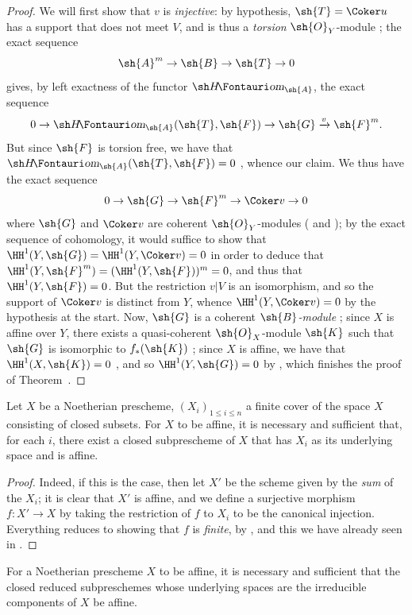 \begin{proof}
We will first show that $v$ is \emph{injective}:
by hypothesis, $\sh{T}=\Coker u$ has a support that does not meet $V$, and is thus a \emph{torsion} $\sh{O}_Y$-module ;
the exact sequence
\[
  \sh{A}^m\to\sh{B}\to\sh{T}\to0
\]
gives, by left exactness of the functor $\shHom_{\sh{A}}$, the exact sequence
\[
  0\to\shHom_{\sh{A}}(\sh{T},\sh{F})\to\sh{G}\xrightarrow{v}\sh{F}^m.
\]
But since $\sh{F}$ is torsion free, we have that $\shHom_{\sh{A}}(\sh{T},\sh{F})=0$ , whence our claim.
We thus have the exact sequence
\[
  0\to\sh{G}\to\sh{F}^m\to\Coker v\to0
\]
where $\sh{G}$ and $\Coker v$ are coherent $\sh{O}_Y$-modules ( and );
by the exact sequence of cohomology, it would suffice to show that $\HH^1(Y,\sh{G})=\HH^1(Y,\Coker v)=0$ in order to deduce that $\HH^1(Y,\sh{F}^m)=(\HH^1(Y,\sh{F}))^m=0$, and thus that $\HH^1(Y,\sh{F})=0$.
But the restriction $v|V$ is an isomorphism, and so the support of $\Coker v$ is distinct from $Y$, whence $\HH^1(Y,\Coker v)=0$ by the hypothesis at the start.
Now, $\sh{G}$ is a coherent \emph{$\sh{B}$-module} ;
since $X$ is affine over $Y$, there exists a quasi-coherent $\sh{O}_X$-module $\sh{K}$ such that $\sh{G}$ is isomorphic to $f_*(\sh{K})$ ;
since $X$ is affine, we have that $\HH^1(X,\sh{K})=0$ , and so $\HH^1(Y,\sh{G})=0$ by , which finishes the proof of Theorem~.
\end{proof}

\begin{corollary}[6.7.2]
\label{II.6.7.2}
Let $X$ be a Noetherian prescheme, $(X_i)_{1\leq i\leq n}$ a finite cover of the space $X$ consisting of closed subsets.
For $X$ to be affine, it is necessary and sufficient that, for each $i$, there exist a closed subprescheme of $X$ that has $X_i$ as its underlying space and is affine.
\end{corollary}

\begin{proof}
Indeed, if this is the case, then let $X'$ be the scheme given by the \emph{sum} of the $X_i$;
it is clear that $X'$ is affine, and we define a surjective morphism $f:X'\to X$ by taking the restriction of $f$ to $X_i$ to be the canonical injection.
Everything reduces to showing that $f$ is \emph{finite}, by , and this we have already seen in .
\end{proof}

\begin{corollary}[6.7.3]
\label{II.6.7.3}
For a Noetherian prescheme $X$ to be affine, it is necessary and sufficient that the closed reduced subpreschemes whose underlying spaces are the irreducible components of $X$ be affine.
\end{corollary}
